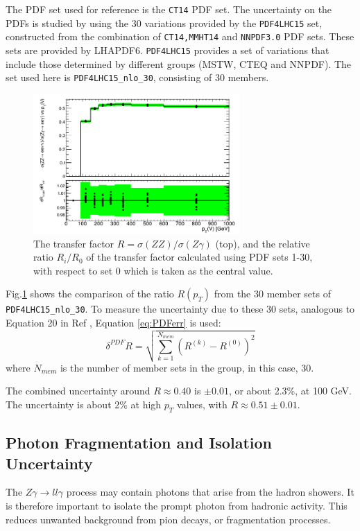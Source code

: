 \documentclass[11pt,a4paper,openright,twoside]{report}
\newcommand{\Zg}{$Z\gamma\to ll\gamma$ }
\begin{document}
The PDF set used for reference is the \texttt{CT14}\cite{CT14} PDF set. The uncertainty on the PDFs is studied by using the 30 variations provided by the \texttt{PDF4LHC15} set\cite{PDF4}, constructed from the combination of \texttt{CT14,MMHT14} and \texttt{NNPDF3.0} PDF sets. These sets are provided by LHAPDF6\cite{LHAPDF}. \texttt{PDF4LHC15} provides a set of variations that include those determined by different groups (MSTW, CTEQ and NNPDF). The set used here is \texttt{PDF4LHC15\_nlo\_30}, consisting of 30 members.
\begin{figure}[H]
\centering
	\includegraphics[width = 0.7\textwidth]{R_pdf.png}
	\caption{The transfer factor $R = \sigma(ZZ)/\sigma(Z\gamma)$ (top), and the relative ratio $R_i/R_0$ of the transfer factor  calculated using PDF sets 1-30, with respect to set 0 which is taken as the central value. }
	\label{fig:PDF30var}
\end{figure}
\noindent Fig.\ref{fig:PDF30var} shows the comparison of the ratio $R(p_T)$ from the 30 member sets of \texttt{PDF4LHC15\_nlo\_30}. To measure the uncertainty due to these 30 sets, analogous to Equation 20 in Ref \cite{PDF4}, Equation \ref{eq:PDFerr} is used:
\begin{equation}\label{eq:PDFerr}
	\delta^{PDF}R = \sqrt{\sum^{N_{mem}}_{k=1} (R^{(k)} - R^{(0)})^2}
\end{equation}
where $N_{mem}$ is the number of member sets in the group, in this case, 30.

\noindent The combined uncertainty around $R \approx 0.40$ is $\pm 0.01$, or about 2.3\%, at 100 GeV. The uncertainty is about 2\% at high $p_T$ values, with $R \approx 0.51 \pm 0.01$.

\subsection{Photon Fragmentation and Isolation Uncertainty}\label{subsec:photon_fragmentation}
The \Zg process may contain photons that arise from the hadron showers. It is therefore important to isolate the prompt photon from hadronic activity. This reduces unwanted background from pion decays, or fragmentation processes.
\end{document}
